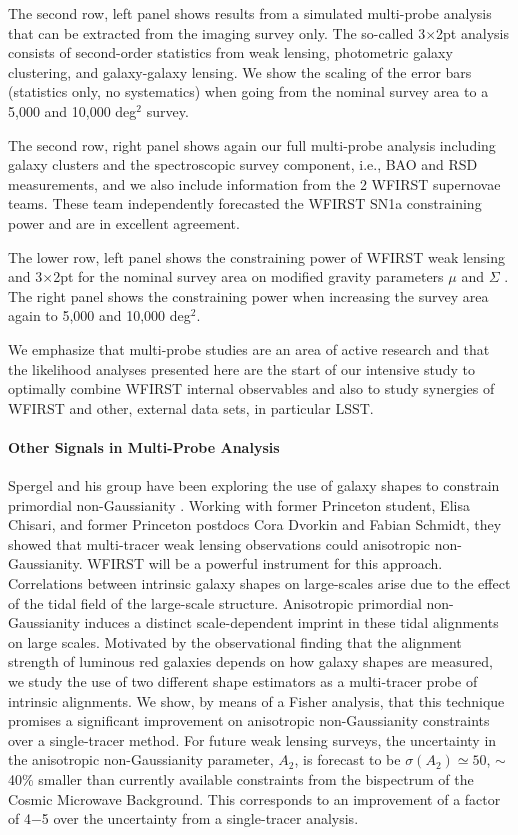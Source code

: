 The second row, left panel shows results from a simulated multi-probe analysis
that can be extracted from the imaging survey only. The so-called 3$\times$2pt analysis
consists of second-order statistics from weak lensing, photometric galaxy
clustering, and galaxy-galaxy lensing. We show the scaling of the error bars
(statistics only, no systematics) when going from the nominal survey area to a
5,000 and 10,000 deg$^2$ survey.

The second row, right panel shows again our full multi-probe analysis including
galaxy clusters and the spectroscopic survey component, i.e., BAO and RSD
measurements, and we also include information from the 2 WFIRST supernovae
teams. These team independently forecasted the WFIRST SN1a constraining power
and are in excellent agreement.

The lower row, left panel shows the constraining power of WFIRST weak lensing
and 3$\times$2pt for the nominal survey area on modified gravity parameters $\mu$ and
$\Sigma$ \citep[see e.g.,][for details]{jjk15, baa15}. The right panel shows the
constraining power when increasing the survey area again to 5,000 and 10,000
deg$^2$.

We emphasize that multi-probe studies are an area of active research and that
the likelihood analyses presented here are the start of our intensive study to
optimally combine WFIRST internal observables and also to study synergies of
WFIRST and other, external data sets, in particular LSST\@.

\paragraph{Other Signals in Multi-Probe Analysis} Spergel and his group have been exploring  the use of galaxy shapes to constrain primordial non-Gaussianity \citep{Chisari:2016xki}. Working with former Princeton student, Elisa Chisari, and former Princeton postdocs Cora Dvorkin and Fabian Schmidt, they showed that
multi-tracer weak lensing observations could anisotropic non-Gaussianity. WFIRST
will be a powerful instrument for this approach.  Correlations between intrinsic
galaxy shapes on large-scales arise due to the effect of the tidal field of the
large-scale structure. Anisotropic primordial non-Gaussianity induces a distinct
scale-dependent imprint in these tidal alignments on large scales. Motivated by
the observational finding that the alignment strength of luminous red galaxies
depends on how galaxy shapes are measured, we study the use of two different
shape estimators as a multi-tracer probe of intrinsic alignments. We show, by
means of a Fisher analysis, that this technique promises a significant
improvement on anisotropic non-Gaussianity constraints over a single-tracer
method. For future weak lensing surveys, the uncertainty in the anisotropic
non-Gaussianity parameter, $A_2$, is forecast to be $\sigma(A_2)\simeq 50$, $\sim$ 40\% smaller than
currently available constraints from the bispectrum of the Cosmic Microwave
Background. This corresponds to an improvement of a factor of 4−5 over the
uncertainty from a single-tracer analysis.

